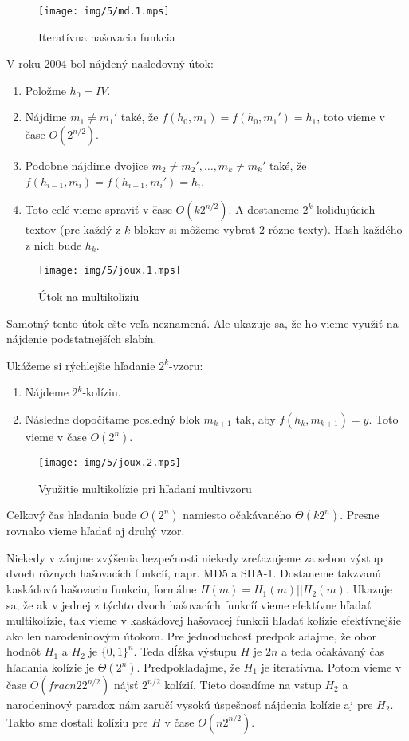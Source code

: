 \begin{figure}[H]
    \label{fig:md}
    \centering
    \texttt{[image: img/5/md.1.mps]}
    \caption{Iteratívna hašovacia funkcia}
\end{figure}


V roku 2004 \cite{Joux04} bol nájdený nasledovný útok:
\begin{enumerate}
\itemsep -1.2mm
\item Položme $h_0 = IV$.
\item Nájdime $m_1 \neq m_1'$ také, že $f(h_0, m_1) = f(h_0, m_1') = h_1$, 
toto vieme v čase $O(2^{n/2})$.
\item Podobne nájdime dvojice $m_2 \neq m_2', \dots, m_k \neq m_k'$ také, 
že $f(h_{i-1}, m_i) = f(h_{i-1}, m_i') = h_i$.
\item Toto celé vieme spraviť v čase $O(k 2^{n/2})$. A dostaneme $2^k$ 
kolidujúcich textov (pre každý z $k$ blokov si môžeme vybrať
2 rôzne texty). Hash každého z nich bude $h_k$.
\end{enumerate}

\begin{figure}[H]
    \label{fig:joux1}
    \centering
    \texttt{[image: img/5/joux.1.mps]}
    \caption{Útok na multikolíziu}
\end{figure}


Samotný tento útok ešte veľa neznamená. Ale ukazuje sa, že
ho vieme využiť na nájdenie podstatnejších slabín.

Ukážeme si rýchlejšie hľadanie $2^k$-vzoru:
\begin{enumerate}
\itemsep -1.2mm
\item Nájdeme $2^k$-kolíziu.
\item Následne dopočítame posledný blok $m_{k+1}$ tak, aby $f(h_k, m_{k+1}) = y$. Toto vieme v čase $O(2^n)$.
\end{enumerate}

\begin{figure}[H]
    \label{fig:joux2}
    \centering
    \texttt{[image: img/5/joux.2.mps]}
    \caption{Využitie multikolízie pri hľadaní multivzoru}
\end{figure}

Celkový čas hľadania bude $O(2^n)$ namiesto očakávaného $\Theta(k 2^n)$. Presne rovnako vieme hľadať aj druhý vzor.

Niekedy v záujme zvýšenia bezpečnosti niekedy zreťazujeme za sebou výstup dvoch rôznych hašovacích funkcíí, napr.
MD5 a SHA-1. Dostaneme takzvanú kaskádovú hašovaciu funkciu, formálne $H(m) = H_1(m)||H_2(m)$. 
Ukazuje sa, že ak v jednej z týchto dvoch hašovacích funkcíí vieme efektívne hľadať multikolízie, tak vieme
v kaskádovej hašovacej funkcii hľadať kolízie efektívnejšie ako len narodeninovým útokom.
Pre jednoduchosť predpokladajme, že obor hodnôt $H_1$
a $H_2$ je $\{0,1\}^n$. Teda dĺžka výstupu $H$ je $2n$ a teda očakávaný čas hľadania kolízie je $\Theta(2^n)$.
Predpokladajme, že $H_1$ je iteratívna. Potom vieme v čase $O(frac{n}{2} 2^{n/2})$ nájsť $2^{n/2}$ kolízií. Tieto dosadíme
na vstup $H_2$ a narodeninový paradox nám zaručí vysokú úspešnosť nájdenia kolízie aj pre $H_2$. Takto sme dostali
kolíziu pre $H$ v čase $O(n 2^{n/2})$.

